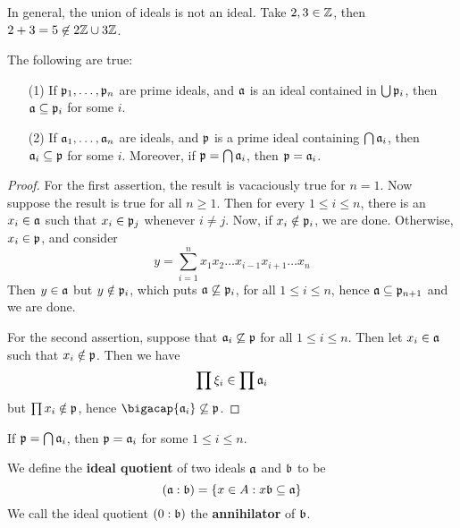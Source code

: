 \begin{example}\label{example_5.19}
  In general, the union of ideals is not an ideal. Take $2,3 \in \Z$, then
  $2+3=5 \not\in 2\Z \cup 3\Z$.
\end{example}


\begin{theorem}\label{theorem_5.5.12}
  The following are true:
  \begin{enumerate}
    \item[(1)] If $\pf_1, \dots, \pf_n$ are prime ideals, and $\af$ is an ideal
      contained in  $\bigcup{\pf_i}$, then $\af \subseteq \pf_i$ for some $i$.

    \item[(2)] If $\af_1, \dots, \af_n$ are ideals, and $\pf$ is a prime ideal
      containing  $\bigcap{\af_i}$, then $\af_i \subseteq \pf$ for some $i$.
      Moreover, if  $\pf=\bigcap{\af_i}$, then $\pf=\af_i$.
  \end{enumerate}
\end{theorem}
\begin{proof}
  For the first assertion, the result is vacaciously true for $n=1$. Now
  suppose the result is true for all  $n \geq 1$. Then for every  $1 \leq i
  \leq n$, there is an  $x_i \in \af$ such that  $x_i \in \pf_j$ whenever  $i
  \neq j$. Now, if  $x_i \notin \pf_i$, we are done. Otherwise, $x_i \in \pf$,
  and consider
  \begin{equation*}
    y=\sum_{i=1}^n{x_1x_2 \dots x_{i-1}x_{i+1} \dots x_n}
  \end{equation*}
  Then $y \in \af$ but $y \notin \pf_i$, which puts  $\af \not\subseteq
  \pf_i$, for all $1 \leq i \leq n$, hence $\af \subseteq \pf_{n+1}$ and we
  are done.

  For the second assertion, suppose that $\af_i \not\subseteq \pf$ for all
  $1 \leq i \leq n$. Then let  $x_i \in \af$ such that  $x_i \notin\pf$. Then
  we have
  \begin{equation*}
    \prod{\x_i} \in \prod{\af_i}
  \end{equation*}
  but $\prod{x_i} \notin \pf$, hence $\bigacap{\af_i} \not\subseteq \pf$.
\end{proof}
\begin{corollary}
  If $\pf=\bigcap{\af_i}$, then $\pf=\af_i$ for some  $1 \leq i \leq n$.
\end{corollary}

\begin{definition}
  We define the \textbf{ideal quotient} of two ideals $\af$ and $\bf$ to be
  \begin{equation*}
    (\af:\bf)=\{x \in A : x\bf \subseteq \af\}
  \end{equation*}
  We call the ideal quotient $(0:\bf)$ the \textbf{annihilator} of $\bf$.
\end{definition}

